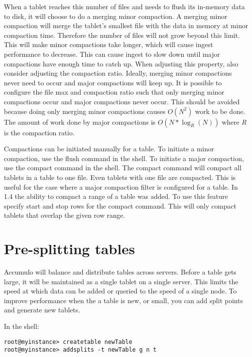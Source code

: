 When a tablet reaches this number of files and needs to flush its in-memory
data to disk, it will choose to do a merging minor compaction.  A merging minor
compaction will merge the tablet's smallest file with the data in memory at
minor compaction time.  Therefore the number of files will not grow beyond this
limit.  This will make minor compactions take longer, which will cause ingest
performance to decrease.  This can cause ingest to slow down until major
compactions have enough time to catch up.   When adjusting this property, also
consider adjusting the compaction ratio. Ideally, merging minor compactions
never need to occur and major compactions will keep up. It is possible to
configure the file max and compaction ratio such that only merging minor
compactions occur and major compactions never occur. This should be avoided
because doing only merging minor compactions causes $O(N^2)$ work to be done.
The amount of work done by major compactions is $O(N*\log_R(N))$ where
\textit{R} is the compaction ratio.

Compactions can be initiated manually for a table.  To initiate a minor
compaction, use the flush command in the shell.  To initiate a major compaction,
use the compact command in the shell.  The compact command will compact all
tablets in a table to one file.  Even tablets with one file are compacted.  This
is useful for the case where a major compaction filter is configured for a
table. In 1.4 the ability to compact a range of a table was added.  To use this
feature specify start and stop rows for the compact command.  This will only
compact tablets that overlap the given row range.

\section{Pre-splitting tables}

Accumulo will balance and distribute tables across servers. Before a
table gets large, it will be maintained as a single tablet on a single
server.  This limits the speed at which data can be added or queried
to the speed of a single node. To improve performance when the a table
is new, or small, you can add split points and generate new tablets.

In the shell:

\small
\begin{verbatim}
root@myinstance> createtable newTable
root@myinstance> addsplits -t newTable g n t
\end{verbatim}
\normalsize

